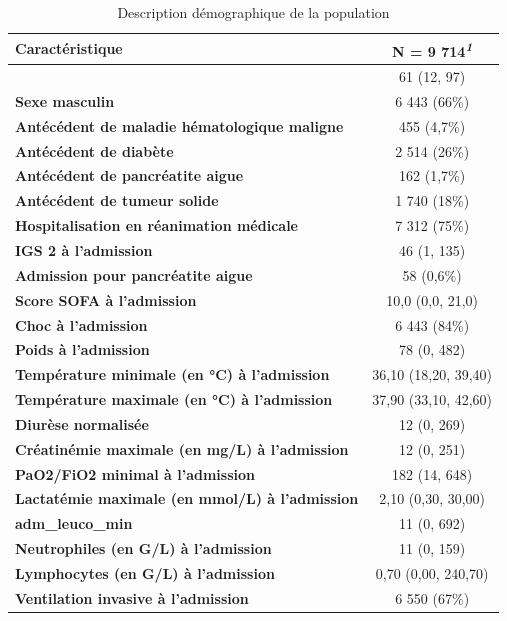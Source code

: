 \documentclass[
  french,
  letterpaper,
  DIV=11,
  numbers=noendperiod,
  justified]{scrartcl}
\begin{document}
\begin{table}
\caption{Description démographique de la population}\tabularnewline

\fontsize{12.0pt}{14.0pt}\selectfont
\begin{tabular*}{\linewidth}{@{\extracolsep{\fill}}lc}
\toprule
\textbf{Caractéristique} & \textbf{N = 9 714}\textsuperscript{\textit{1}} \\
\midrule\addlinespace[2.5pt]
{\bfseries Age} & 61 (12, 97) \\
{\bfseries Sexe masculin} & 6 443 (66\%) \\
{\bfseries Antécédent de maladie hématologique maligne} & 455 (4,7\%) \\
{\bfseries Antécédent de diabète} & 2 514 (26\%) \\
{\bfseries Antécédent de pancréatite aigue} & 162 (1,7\%) \\
{\bfseries Antécédent de tumeur solide} & 1 740 (18\%) \\
{\bfseries Hospitalisation en réanimation médicale} & 7 312 (75\%) \\
{\bfseries IGS 2 à l'admission} & 46 (1, 135) \\
{\bfseries Admission pour pancréatite aigue} & 58 (0,6\%) \\
{\bfseries Score SOFA à l'admission} & 10,0 (0,0, 21,0) \\
{\bfseries Choc à l'admission} & 6 443 (84\%) \\
{\bfseries Poids à l'admission} & 78 (0, 482) \\
{\bfseries Température minimale (en °C) à l'admission} & 36,10 (18,20, 39,40) \\
{\bfseries Température maximale (en °C) à l'admission} & 37,90 (33,10, 42,60) \\
{\bfseries Diurèse normalisée} & 12 (0, 269) \\
{\bfseries Créatinémie maximale (en mg/L) à l'admission} & 12 (0, 251) \\
{\bfseries PaO2/FiO2 minimal à l'admission} & 182 (14, 648) \\
{\bfseries Lactatémie maximale (en mmol/L) à l'admission} & 2,10 (0,30, 30,00) \\
{\bfseries adm\_leuco\_min} & 11 (0, 692) \\
{\bfseries Neutrophiles (en G/L) à l'admission} & 11 (0, 159) \\
{\bfseries Lymphocytes (en G/L) à l'admission} & 0,70 (0,00, 240,70) \\
{\bfseries Ventilation invasive à l'admission} & 6 550 (67\%) \\

\end{tabular*}
\end{table}
\end{document}
